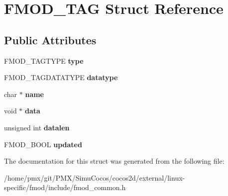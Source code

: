 \hypertarget{structFMOD__TAG}{}\section{F\+M\+O\+D\+\_\+\+T\+AG Struct Reference}
\label{structFMOD__TAG}
\subsection*{Public Attributes}
\begin{DoxyCompactItemize}
\item 
\mbox{\label{structFMOD__TAG_ad891c5f78e72ffeebc0f39e34e5b1b20}} 
F\+M\+O\+D\+\_\+\+T\+A\+G\+T\+Y\+PE {\bfseries type}
\item 
\mbox{\label{structFMOD__TAG_acc0f4bf92ee045d5828ba7eccc3c4c23}} 
F\+M\+O\+D\+\_\+\+T\+A\+G\+D\+A\+T\+A\+T\+Y\+PE {\bfseries datatype}
\item 
\mbox{\label{structFMOD__TAG_a7190b11e70e3b20ebe9d14e33a63f175}} 
char $\ast$ {\bfseries name}
\item 
\mbox{\label{structFMOD__TAG_a4bef041c500c9574daa3d435963470c0}} 
void $\ast$ {\bfseries data}
\item 
\mbox{\label{structFMOD__TAG_a589281f4f1adc717798744722ec43761}} 
unsigned int {\bfseries datalen}
\item 
\mbox{\label{structFMOD__TAG_a0358f4afc9957d3d3254691c3118d90a}} 
F\+M\+O\+D\+\_\+\+B\+O\+OL {\bfseries updated}
\end{DoxyCompactItemize}


The documentation for this struct was generated from the following file\+:\begin{DoxyCompactItemize}
\item 
/home/pmx/git/\+P\+M\+X/\+Simu\+Cocos/cocos2d/external/linux-\/specific/fmod/include/fmod\+\_\+common.\+h\end{DoxyCompactItemize}

